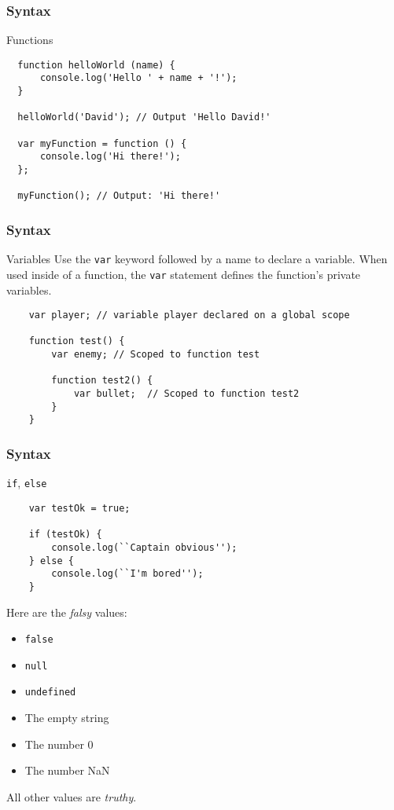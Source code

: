 \begin{frame}[fragile]
  \frametitle{Syntax}

  \begin{block}{Functions}
  {\scriptsize
  \begin{verbatim}
  function helloWorld (name) {
      console.log('Hello ' + name + '!');
  }

  helloWorld('David'); // Output 'Hello David!'

  var myFunction = function () {
      console.log('Hi there!');
  };

  myFunction(); // Output: 'Hi there!'
  \end{verbatim}
  }
  \end{block}
\end{frame}

\begin{frame}[fragile]
  \frametitle{Syntax}

  \begin{block}{Variables}
    Use the \texttt{var} keyword followed by a name to declare a variable. When used inside of a function, the \texttt{var} statement defines the function's private variables.
    {\scriptsize
    \begin{verbatim}
    var player; // variable player declared on a global scope

    function test() {
        var enemy; // Scoped to function test

        function test2() {
            var bullet;  // Scoped to function test2
        }
    }
    \end{verbatim}
    }
  \end{block}
\end{frame}

\begin{frame}[fragile]
  \frametitle{Syntax}

  \begin{block}{\texttt{if}, \texttt{else}}
    \scriptsize{
    \begin{verbatim}
    var testOk = true;

    if (testOk) {
        console.log(``Captain obvious'');
    } else {
        console.log(``I'm bored'');
    }
    \end{verbatim}
    }
    Here are the \textit{falsy} values:
    \begin{itemize}
      \item \texttt{false}
      \item \texttt{null}
      \item \texttt{undefined}
      \item The empty string
      \item The number 0
      \item The number NaN
    \end{itemize}
    All other values are \textit{truthy}.
  \end{block}
\end{frame}

